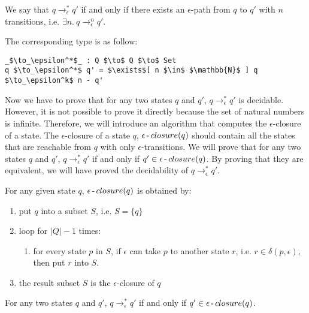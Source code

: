 \begin{defn}
\noindent We say that \(q \to_\epsilon^* q'\) if and only if there
exists an \(\epsilon\)-path from \(q\) to \(q'\) with \(n\) transitions, i.e. \(\exists n.\ q \to_\epsilon^n q'\). 
\end{defn}

\par The corresponding type is as follow: 
\begin{lstlisting}[mathescape=true,xleftmargin=.3\textwidth]
_$\to_\epsilon^*$_ : Q $\to$ Q $\to$ Set
q $\to_\epsilon^*$ q' = $\exists$[ n $\in$ $\mathbb{N}$ ] q $\to_\epsilon^k$ n - q'
\end{lstlisting}

\par Now we have to prove that for any two states \(q\) and \(q'\), 
\(q \to_\epsilon^* q'\) is decidable. However, it is not possible to
prove it directly because the set of natural numbers is
infinite. Therefore, we will introduce an algorithm that computes the
\(\epsilon\)-closure of a state. The \(\epsilon\)-closure of a state
\(q\), \(\epsilon\operatorname{-} closure(q)\) should contain all the states
that are reachable from \(q\) with only \(\epsilon\)-transitions. We will prove that for any two states
\(q\) and \(q'\), \(q \to_\epsilon^* q'\) if and only if \(q' \in \epsilon\operatorname{-} closure(q)\). By proving that they are equivalent, we
will have proved the decidability of \(q \to_\epsilon^* q'\). 

\begin{defn}
\noindent For any given state \(q\), \(\epsilon\operatorname{-} closure(q)\) is obtained by: 
\begin{enumerate}[nolistsep]
  \item put \(q\) into a subset \(S\), i.e. \(S = \{q\}\)
  \item loop for \(|Q| - 1\) times: 
  \begin{enumerate}
    \item for every state \(p\) in \(S\), if \(\epsilon\) can take
      \(p\) to another state \(r\), i.e. \(r \in
        \delta (p,\epsilon)\), then put \(r\) into \(S\). 
  \end{enumerate}
  \item the result subset \(S\) is the \(\epsilon\)-closure of \(q\)
\end{enumerate}
\end{defn}

\begin{lem}
\noindent For any two states \(q\) and \(q'\), \(q \to_\epsilon^* q'\)
if and only if \(q' \in \epsilon\operatorname{-} closure(q)\). 
\end{lem}

